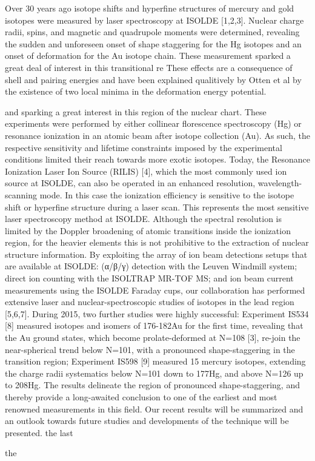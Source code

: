 Over 30 years ago isotope shifts and hyperfine structures of mercury and gold isotopes were measured by laser spectroscopy at ISOLDE [1,2,3]. Nuclear charge radii, spins, and magnetic and quadrupole moments were determined, revealing the sudden and unforeseen onset of shape staggering for the Hg isotopes and an onset of deformation for the Au isotope chain.  These measurement sparked a great deal of interest in this transitional re
These effects are a consequence of shell and pairing energies and have been explained qualitively by Otten et al by the existence of two local minima in the deformation energy potential.

and sparking a great interest in this region of the nuclear chart.  These experiments were performed by either collinear florescence spectroscopy (Hg) or resonance ionization in an atomic beam after isotope collection (Au).  As such, the respective sensitivity and lifetime constraints imposed by the experimental conditions limited their reach towards more exotic isotopes.  Today, the Resonance Ionization Laser Ion Source (RILIS) [4], which the most commonly used ion source at ISOLDE, can also be operated in an enhanced resolution, wavelength-scanning mode. In this case the ionization efficiency is sensitive to the isotope shift or hyperfine structure during a laser scan.  This represents the most sensitive laser spectroscopy method at ISOLDE. Although the spectral resolution is limited by the Doppler broadening of atomic transitions inside the ionization region, for the heavier elements this is not prohibitive to the extraction of nuclear structure information.  By exploiting the array of ion beam detections setups that are available at ISOLDE: (α/β/γ) detection with the Leuven Windmill system; direct ion counting with the ISOLTRAP MR-TOF MS; and ion beam current measurements using the ISOLDE Faraday cups, our collaboration has performed extensive laser and nuclear-spectroscopic studies of isotopes in the lead region [5,6,7].  During 2015, two further studies were highly successful: Experiment IS534 [8] measured isotopes and isomers of 176-182Au for the first time, revealing that the Au ground states, which become prolate-deformed at N=108 [3], re-join the near-spherical trend below N=101, with a pronounced shape-staggering in the transition region; Experiment IS598 [9] measured 15 mercury isotopes, extending the charge radii systematics below N=101 down to 177Hg, and above N=126 up to 208Hg.  The results delineate the region of pronounced shape-staggering, and thereby provide a long-awaited conclusion to one of the earliest and most renowned measurements in this field.   Our recent results will be summarized and an outlook towards future studies and developments of the technique will be presented.   the last 


the